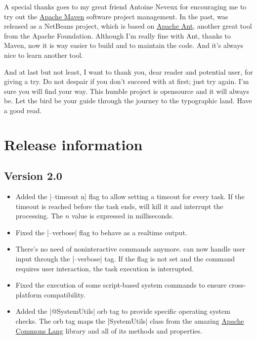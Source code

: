 \documentclass[a4paper,twoside,12pt]{memoir}
\begin{document}
A special thanks goes to my great friend Antoine Neveux for encouraging me to try out the \href{http://maven.apache.org}{Apache Maven} software project management. In the past, \arara was released as a NetBeans project, which is based on \href{http://ant.apache.org/}{Apache Ant}, another great tool from the Apache Foundation. Although I'm really fine with Ant, thanks to Maven, now it is way easier to build and to maintain the code. And it's always nice to learn another tool.

And at last but not least, I want to thank you, dear reader and potential user, 
for giving \arara a try. Do not despair if you don't succeed with \arara at first; just try again. I'm sure you will find your way. This humble project is opensource and it will always be. Let the bird be your guide through the journey to the typographic land. Have a good read.

\cleardoublepage

\section*{Release information}

\subsection*{Version 2.0}
\begin{itemize}
\item[\newfeature] 
     Added the |--timeout n| flag to allow setting a timeout for every task. If
     the timeout is reached before the task ends, \arara will kill it and 
     interrupt the processing. The $n$ value is expressed in milliseconds.
\item[\bugfix] 
     Fixed the |--verbose| flag to behave as a realtime output.
\item[\newfeature] 
     There's no need of noninteractive commands anymore. \arara can now handle
     user input through the |--verbose| tag. If the flag is not set and the 
     command requires user interaction, the task execution is interrupted.
\item[\bugfix] 
     Fixed the execution of some script-based system commands to ensure 
     cross-platform compatibility.
\item[\newfeature] 
     Added the |@{SystemUtils}| orb tag to provide specific operating system 
     checks. The orb tag maps the |SystemUtils| class from the amazing 
     \href{http://commons.apache.org/lang/}{Apache Commons Lang} library and 
     all of its methods and properties.
\end{itemize}
\end{document}
